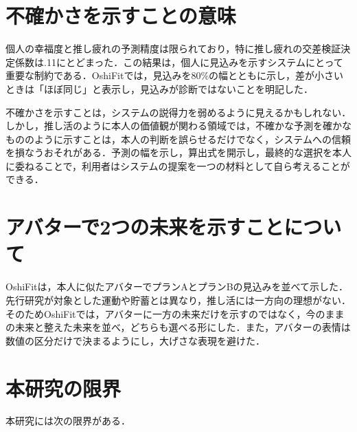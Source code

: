 
\section{不確かさを示すことの意味}
個人の幸福度と推し疲れの予測精度は限られており，特に推し疲れの交差検証決定係数は.11にとどまった．この結果は，個人に見込みを示すシステムにとって重要な制約である．OshiFitでは，見込みを80\%の幅とともに示し，差が小さいときは「ほぼ同じ」と表示し，見込みが診断ではないことを明記した．

不確かさを示すことは，システムの説得力を弱めるように見えるかもしれない．しかし，推し活のように本人の価値観が関わる領域では，不確かな予測を確かなもののように示すことは，本人の判断を誤らせるだけでなく，システムへの信頼を損なうおそれがある．予測の幅を示し，算出式を開示し，最終的な選択を本人に委ねることで，利用者はシステムの提案を一つの材料として自ら考えることができる．


\section{アバターで2つの未来を示すことについて}
OshiFitは，本人に似たアバターでプランAとプランBの見込みを並べて示した．先行研究\cite{fox2009,hershfield2011}が対象とした運動や貯蓄とは異なり，推し活には一方向の理想がない．そのためOshiFitでは，アバターに一方の未来だけを示すのではなく，今のままの未来と整えた未来を並べ，どちらも選べる形にした．また，アバターの表情は数値の区分だけで決まるようにし，大げさな表現を避けた．


\section{本研究の限界}
本研究には次の限界がある．

